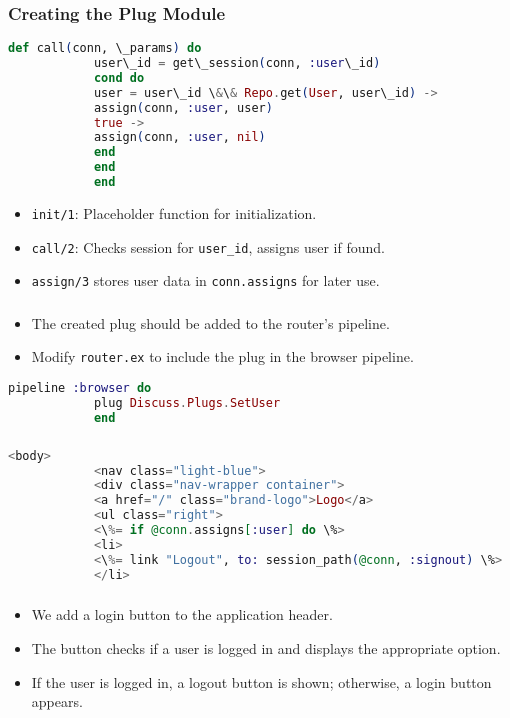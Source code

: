 \documentclass[aspectratio=169, table]{beamer}
\begin{document}
	\begin{frame}[fragile]
		\frametitle{Creating the Plug Module}
		\begin{lstlisting}[language=Elixir]
			def call(conn, \_params) do
			user\_id = get\_session(conn, :user\_id)
			cond do
			user = user\_id \&\& Repo.get(User, user\_id) ->
			assign(conn, :user, user)
			true ->
			assign(conn, :user, nil)
			end
			end
			end
		\end{lstlisting}
		\begin{itemize}
			\item \texttt{init/1}: Placeholder function for initialization.
			\item \texttt{call/2}: Checks session for \texttt{user\_id}, assigns user if found.
			\item \texttt{assign/3} stores user data in \texttt{conn.assigns} for later use.
		\end{itemize}
	\end{frame}
	
	\begin{frame}[fragile]
		\frametitle{}
		\begin{itemize}
			\item The created plug should be added to the router's pipeline.
			\item Modify \texttt{router.ex} to include the plug in the browser pipeline.
		\end{itemize}
		\begin{lstlisting}[language=Elixir]
			pipeline :browser do
			plug Discuss.Plugs.SetUser
			end
		\end{lstlisting}
	\end{frame}
	
	\begin{frame}[fragile]
		\frametitle{}
		\begin{lstlisting}[language=Elixir]
			<body>
			<nav class="light-blue">
			<div class="nav-wrapper container">
			<a href="/" class="brand-logo">Logo</a>
			<ul class="right">
			<\%= if @conn.assigns[:user] do \%>
			<li>
			<\%= link "Logout", to: session_path(@conn, :signout) \%>
			</li>
		\end{lstlisting}
	\end{frame}
	
	\begin{frame}[fragile]
		\frametitle{}
		\begin{itemize}
			\item We add a login button to the application header.
			\item The button checks if a user is logged in and displays the appropriate option.
			\item If the user is logged in, a logout button is shown; otherwise, a login button appears.
		\end{itemize}
	\end{frame}
	
\end{document}
